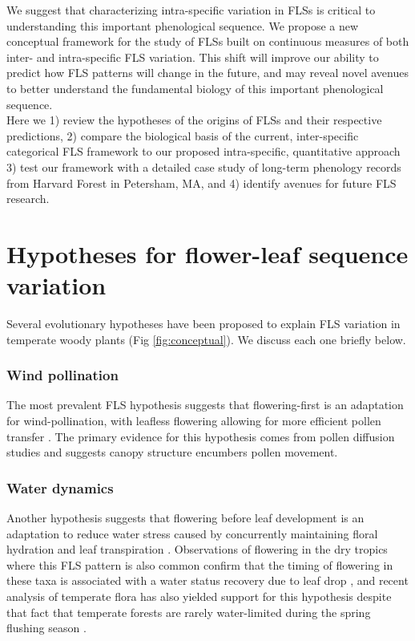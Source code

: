 \documentclass[11pt]{article}
\begin{document}
We suggest that characterizing intra-specific variation in FLSs is critical to understanding this important phenological sequence. We propose a new conceptual framework for the study of FLSs built on continuous measures of both inter- and intra-specific FLS variation. This shift will improve our ability to predict how FLS patterns will change in the future, and  may reveal novel avenues to better understand the fundamental biology of this important phenological sequence.\\


\noindent Here we 1) review the hypotheses of the origins of FLSs and their respective predictions, 2) compare the biological basis of the current, inter-specific categorical FLS framework to our proposed intra-specific, quantitative approach 3) test our framework with a detailed case study of long-term phenology records from Harvard Forest in Petersham, MA, and 4) identify avenues for future FLS research.

\section*{Hypotheses for flower-leaf sequence variation}
\noident Several evolutionary hypotheses have been proposed to explain FLS variation in temperate woody plants (Fig \ref{fig:conceptual}). We discuss each one briefly below.
\subsubsection*{ Wind pollination}
\noindent The most prevalent FLS hypothesis suggests that flowering-first is an adaptation for wind-pollination, with leafless flowering allowing for more efficient pollen transfer \citep{Whitehead1969}. The primary evidence for this hypothesis comes from pollen diffusion studies \citep[e.g., particle movement through closed and open canopies,][]{Niklas1985, Milleron2012} and suggests canopy structure encumbers pollen movement. %
\subsubsection*{Water dynamics}
\noindent Another hypothesis suggests that flowering before leaf development is an adaptation to reduce water stress caused by concurrently maintaining floral hydration and leaf transpiration \citep{Franklin2016}. Observations of flowering in the dry tropics where this FLS pattern is also common confirm that the timing of flowering in these taxa is associated with a water status recovery due to leaf drop \citep{Borchert1983,Reich1984}, and recent analysis of temperate flora has also yielded support for this hypothesis despite that fact that temperate forests are rarely water-limited during the spring flushing season \citep{Gougherty2018}. %
 
\end{document}
